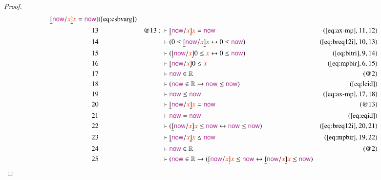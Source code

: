 \begin{proof}
\begin{align}
      \underline{[} \mathsf{\mc{now}} / \msc{x}
      \underline{]} \msc{x} = \mathsf{\mc{now}}
      )&(\mbox{\ref{eq:csbvarg}})\notag
  \\ 13 && @13:\  & \vdash \underline{[} \mathsf{\mc{now}} / \msc{x}
      \underline{]} \msc{x} =
      \mathsf{\mc{now}}&(\mbox{\ref{eq:ax-mp}},11,12)\notag
  \\ 14 &&  & \vdash ( 0 \le \underline{[} \mathsf{\mc{now}} / \msc{x}
      \underline{]} \msc{x} \leftrightarrow 0 \le
      \mathsf{\mc{now}}
      )&(\mbox{\ref{eq:breq12i}},10,13)\notag
  \\ 15 &&  & \vdash ( \underaccent{\dot}{[} \mathsf{\mc{now}} / \msc{x}
      \underaccent{\dot}{]} 0 \le \msc{x} \leftrightarrow 0
      \le \mathsf{\mc{now}}
      )&(\mbox{\ref{eq:bitri}},9,14)\notag
  \\ 16 &&  & \vdash \underaccent{\dot}{[} \mathsf{\mc{now}} / \msc{x}
      \underaccent{\dot}{]} 0 \le
      \msc{x}&(\mbox{\ref{eq:mpbir}},6,15)\notag
  \\ 17 &&  & \vdash \mathsf{\mc{now}} \in \mathbb{R}&(@2)\notag
  \\ 18 &&  & \vdash ( \mathsf{\mc{now}} \in \mathbb{R} \rightarrow
      \mathsf{\mc{now}} \le \mathsf{\mc{now}}
      )&(\mbox{\ref{eq:leid}})\notag
  \\ 19 &&  & \vdash \mathsf{\mc{now}} \le
      \mathsf{\mc{now}}&(\mbox{\ref{eq:ax-mp}},17,18)\notag
  \\ 20 &&  & \vdash \underline{[} \mathsf{\mc{now}} / \msc{x} \underline{]}
      \msc{x} = \mathsf{\mc{now}}&(@13)\notag
  \\ 21 &&  & \vdash \mathsf{\mc{now}} =
      \mathsf{\mc{now}}&(\mbox{\ref{eq:eqid}})\notag
  \\ 22 &&  & \vdash ( \underline{[} \mathsf{\mc{now}} / \msc{x} \underline{]}
      \msc{x} \le \mathsf{\mc{now}} \leftrightarrow
      \mathsf{\mc{now}} \le \mathsf{\mc{now}}
      )&(\mbox{\ref{eq:breq12i}},20,21)\notag
  \\ 23 &&  & \vdash \underline{[} \mathsf{\mc{now}} / \msc{x} \underline{]}
      \msc{x} \le
      \mathsf{\mc{now}}&(\mbox{\ref{eq:mpbir}},19,22)\notag
  \\ 24 &&  & \vdash \mathsf{\mc{now}} \in \mathbb{R}&(@2)\notag
  \\ 25 &&  & \vdash ( \mathsf{\mc{now}} \in \mathbb{R} \rightarrow (
      \underaccent{\dot}{[} \mathsf{\mc{now}} / \msc{x}
      \underaccent{\dot}{]} \msc{x} \le \mathsf{\mc{now}}
      \leftrightarrow \underline{[} \mathsf{\mc{now}} /
      \msc{x} \underline{]} \msc{x} \le \mathsf{\mc{now}} )

\end{align}
\end{proof}
